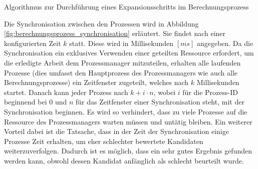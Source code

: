 \begin{algorithm}[H]
    \DontPrintSemicolon
    \caption{Algorithmus zur Durchführung eines Expansionsschritts im Berechnungsprozess}
    \label{alg:expand_berechnung}
\end{algorithm}

Die Synchronisation zwischen den Prozessen wird in Abbildung \ref{fig:berechnungsprozess_synchronisation} erläutert.
Sie findet nach einer konfigurierten Zeit $k$ statt.
Diese wird in Millisekunden $[ms]$ angegeben.
Da die Synchronisation ein exklusives Verwenden einer geteilten Ressource erfordert, um die erledigte Arbeit
dem Prozessmanager mitzuteilen, erhalten alle laufenden Prozesse (dies umfasst den Hauptprozess des Prozessmanagers wie auch
alle Berechnungsprozesse) ein Zeitfenster zugeteilt, welches nach $k$ Millisekunden startet.
Danach kann jeder Prozess nach $k + i \cdot n$, wobei $i$ für die Prozess-ID beginnend bei $0$ und $n$ für das
Zeitfenster einer Synchronisation steht, mit der Synchronisation beginnen. Es wird so verhindert,
dass zu viele Prozesse auf die Ressource des Prozessmanagers warten müssen und untätig bleiben.
Ein weiterer Vorteil dabei ist die Tatsache, dass in der Zeit der Synchronisation einige Prozesse Zeit erhalten,
um eher schlechter bewertete Kandidaten weiterzuverfolgen.
Dadurch ist es möglich, dass ein sehr gutes Ergebnis gefunden werden kann,
obwohl dessen Kandidat anfänglich als schlecht beurteilt wurde.

